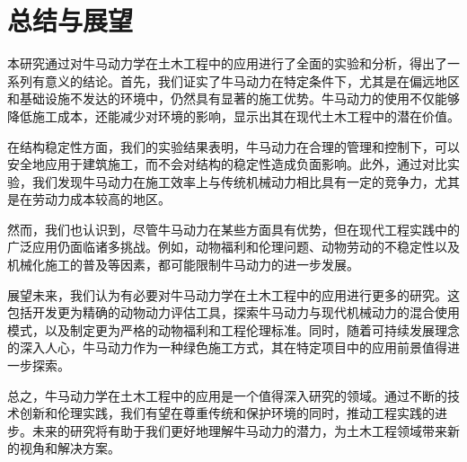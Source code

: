 \chapter{总结与展望}
本研究通过对牛马动力学在土木工程中的应用进行了全面的实验和分析，得出了一系列有意义的结论。首先，我们证实了牛马动力在特定条件下，尤其是在偏远地区和基础设施不发达的环境中，仍然具有显著的施工优势。牛马动力的使用不仅能够降低施工成本，还能减少对环境的影响，显示出其在现代土木工程中的潜在价值\cite{kim2021sustainability}。

在结构稳定性方面，我们的实验结果表明，牛马动力在合理的管理和控制下，可以安全地应用于建筑施工，而不会对结构的稳定性造成负面影响\cite{chen2023experiments}。此外，通过对比实验，我们发现牛马动力在施工效率上与传统机械动力相比具有一定的竞争力，尤其是在劳动力成本较高的地区\cite{brown2022casestudies}。

然而，我们也认识到，尽管牛马动力在某些方面具有优势，但在现代工程实践中的广泛应用仍面临诸多挑战。例如，动物福利和伦理问题、动物劳动的不稳定性以及机械化施工的普及等因素，都可能限制牛马动力的进一步发展。

展望未来，我们认为有必要对牛马动力学在土木工程中的应用进行更多的研究。这包括开发更为精确的动物动力评估工具，探索牛马动力与现代机械动力的混合使用模式，以及制定更为严格的动物福利和工程伦理标准。同时，随着可持续发展理念的深入人心，牛马动力作为一种绿色施工方式，其在特定项目中的应用前景值得进一步探索。

总之，牛马动力学在土木工程中的应用是一个值得深入研究的领域。通过不断的技术创新和伦理实践，我们有望在尊重传统和保护环境的同时，推动工程实践的进步。未来的研究将有助于我们更好地理解牛马动力的潜力，为土木工程领域带来新的视角和解决方案。